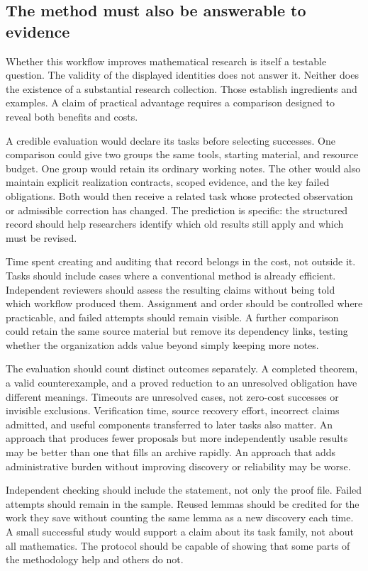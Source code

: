 \subsection{The method must also be answerable to evidence}

Whether this workflow improves mathematical research is itself a testable question. The validity of the displayed identities does not answer it. Neither does the existence of a substantial research collection. Those establish ingredients and examples. A claim of practical advantage requires a comparison designed to reveal both benefits and costs.

A credible evaluation would declare its tasks before selecting successes. One comparison could give two groups the same tools, starting material, and resource budget. One group would retain its ordinary working notes. The other would also maintain explicit realization contracts, scoped evidence, and the key failed obligations. Both would then receive a related task whose protected observation or admissible correction has changed. The prediction is specific: the structured record should help researchers identify which old results still apply and which must be revised.

Time spent creating and auditing that record belongs in the cost, not outside it. Tasks should include cases where a conventional method is already efficient. Independent reviewers should assess the resulting claims without being told which workflow produced them. Assignment and order should be controlled where practicable, and failed attempts should remain visible. A further comparison could retain the same source material but remove its dependency links, testing whether the organization adds value beyond simply keeping more notes.

The evaluation should count distinct outcomes separately. A completed theorem, a valid counterexample, and a proved reduction to an unresolved obligation have different meanings. Timeouts are unresolved cases, not zero-cost successes or invisible exclusions. Verification time, source recovery effort, incorrect claims admitted, and useful components transferred to later tasks also matter. An approach that produces fewer proposals but more independently usable results may be better than one that fills an archive rapidly. An approach that adds administrative burden without improving discovery or reliability may be worse.

Independent checking should include the statement, not only the proof file. Failed attempts should remain in the sample. Reused lemmas should be credited for the work they save without counting the same lemma as a new discovery each time. A small successful study would support a claim about its task family, not about all mathematics. The protocol should be capable of showing that some parts of the methodology help and others do not.

